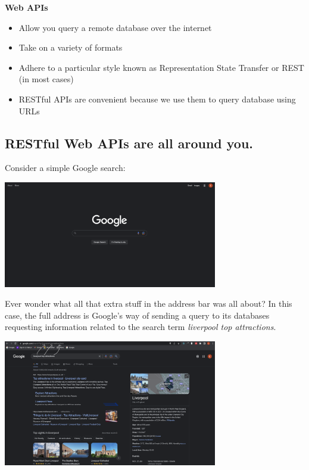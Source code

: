 \documentclass[
  letterpaper,
  DIV=11,
  numbers=noendperiod]{scrreprt}
\begin{document}
\textbf{Web APIs}

\begin{itemize}
\item
  Allow you query a remote database over the internet
\item
  Take on a variety of formats
\item
  Adhere to a particular style known as Representation State Transfer or
  REST (in most cases)
\item
  RESTful APIs are convenient because we use them to query database
  using URLs
\end{itemize}

\hypertarget{restful-web-apis-are-all-around-you.}{%
\subsection{RESTful Web APIs are all around
you.}\label{restful-web-apis-are-all-around-you.}}

Consider a simple Google search:

\includegraphics[width=0.7\textwidth,height=\textheight]{././img/google.png}

Ever wonder what all that extra stuff in the address bar was all about?
In this case, the full address is Google's way of sending a query to its
databases requesting information related to the search term
\emph{liverpool top attractions}.

\includegraphics[width=0.7\textwidth,height=\textheight]{././img/liv_attractions.png}
\end{document}
